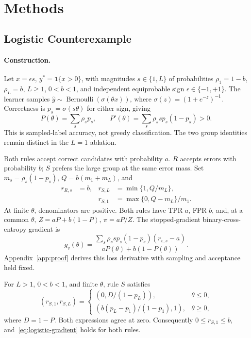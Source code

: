 \section{Methods}
\label{sec:methods}

\subsection{Logistic Counterexample}
\label{sec:logistic}

\paragraph{Construction.}
Let $x=\epsilon s$, $y^*=\mathbf1\{x>0\}$, with magnitudes
$s\in\{1,L\}$ of probabilities $\rho_1=1-b$, $\rho_L=b$,
$L\geq1$, $0<b<1$, and independent equiprobable sign $\epsilon\in\{-1,+1\}$.
The learner samples $\hat y\sim\operatorname{Bernoulli}(\sigma(\theta x))$,
where $\sigma(z)=(1+e^{-z})^{-1}$. Correctness is $p_s=\sigma(s\theta)$
for either sign, giving
\begin{equation}
 P(\theta)=\sum_s\rho_s p_s,\qquad
 P'(\theta)=\sum_s\rho_s s p_s(1-p_s)>0.
 \label{eq:sampling-accuracy}
\end{equation}
This is sampled-label accuracy, not greedy classification. The two group
identities remain distinct in the $L=1$ ablation.

Both rules accept correct candidates with probability $a$. $R$ accepts errors
with probability $b$; $S$ prefers the large group at the same error mass.
Set $m_s=\rho_s(1-p_s)$, $Q=b(m_1+m_L)$, and
\begin{equation}
 \begin{aligned}
 r_{R,s}&=b, &r_{S,L}&=\min\{1,Q/m_L\},\\
 &&r_{S,1}&=\max\{0,Q-m_L\}/m_1.
 \end{aligned}
 \label{eq:structured-rule}
\end{equation}
At finite $\theta$, denominators are positive. Both rules have TPR $a$,
FPR $b$, and, at a common $\theta$, $Z=aP+b(1-P)$, $\pi=aP/Z$.
The stopped-gradient binary-cross-entropy gradient is
\begin{equation}
 g_v(\theta)=\frac{\sum_s\rho_s s p_s(1-p_s)(r_{v,s}-a)}
 {aP(\theta)+b(1-P(\theta))}.
 \label{eq:logistic-gradient}
\end{equation}
Appendix~\ref{app:proof} derives this loss derivative with sampling and
acceptance held fixed.

\begin{lemma}
\label{lem:piecewise}
For $L>1$, $0<b<1$, and finite $\theta$, rule $S$ satisfies
\begin{equation}
 (r_{S,1},r_{S,L})=
 \begin{cases}
 (0,D/(1-p_L)),&\theta\leq0,\\
 (b(p_L-p_1)/(1-p_1),1),&\theta\geq0,
 \end{cases}
 \label{eq:piecewise}
\end{equation}
where $D=1-P$. Both expressions agree at zero. Consequently
$0\leq r_{S,1}\leq b$, and~\eqref{eq:logistic-gradient} holds for both rules.
\end{lemma}


